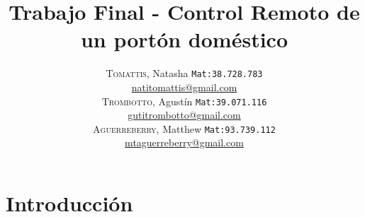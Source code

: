\documentclass[16pt, article,notitlepage]{article}
\newcommand{\HRule}{\rule{\linewidth}{0.5mm}} %
\begin{document}
\begin{figure}[H] %
\end{figure}


\title{%
	{ \bfseries{Trabajo Final - Control Remoto de un portón doméstico}}\\[0.4cm]
} %
\author{
	\textsc{Tomattis}, Natasha  {\small \texttt{Mat:38.728.783}}\\
	\href{mailto:natitomattis@gmail.com}{natitomattis@gmail.com}\\
	\textsc{Trombotto}, Agustín  {\small \texttt{Mat:39.071.116}}\\
	\href{mailto:gutitrombotto@gmail.com}{gutitrombotto@gmail.com}\\
	\textsc{Aguerreberry}, Matthew  {\small \texttt{Mat:93.739.112}}\\
	\href{mailto:mtaguerreberry@gmail.com}{mtaguerreberry@gmail.com}\\
}

{\let\newpage\relax\maketitle}

\newpage

\maketitle
 
\tableofcontents

\newpage
\section{Introducción}
 
\end{document}
